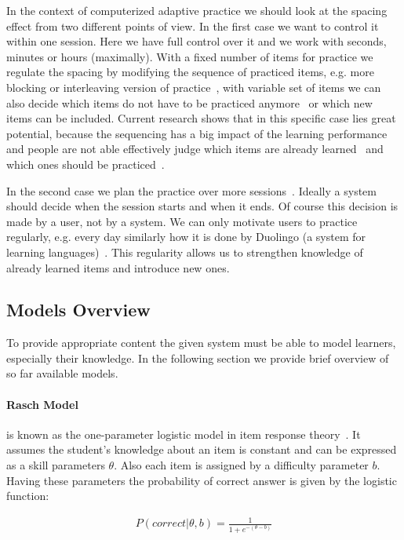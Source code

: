 \documentclass[table,color,cover,twoside,nolot,nolof]{fithesis3/fithesis3}
\begin{document}
In the context of computerized adaptive practice we should look at the spacing
effect from two different points of view. In the first case we want to control
it within one session. Here we have full control over it and we work with
seconds, minutes or hours (maximally). With a fixed number of items for
practice we regulate the spacing by modifying the sequence of practiced items,
e.g. more blocking or interleaving version of
practice~\cite{ostrow2015blocking}, with variable set of items we can also
decide which items do not have to be practiced
anymore~\cite{kornell2008optimising} or which new items can be included.
Current research shows that in this specific case lies great potential, because
the sequencing has a big impact of the learning
performance~\cite{ostrow2015blocking} and people are not able effectively judge
which items are already learned~\cite{kornell2008optimising} and which ones
should be practiced~\cite{kornell2014focusing}.

In the second case we plan the practice over more
sessions~\cite{kang2014retrieval}. Ideally a system should decide when the
session starts and when it ends. Of course this decision is made by a user,
not by a system. We can only motivate users to practice regularly, e.g. every
day similarly how it is done by Duolingo (a system for learning
languages)~\cite{garcia2013learning}. This regularity allows us to strengthen
knowledge of already learned items and introduce new ones.

\subsection{Models Overview}

To provide appropriate content the given system must be able to model learners,
especially their knowledge. In the following section we provide brief overview
of so far available models.

\paragraph*{Rasch Model} is known as the one-parameter logistic model in item
response theory~\cite{de2008theory}. It assumes the student's knowledge about
an item is constant and can be expressed as a skill parameters $\theta$. Also
each item is assigned by a difficulty parameter $b$. Having these parameters
the probability of correct answer is given by the logistic function:

\begin{align}
P(correct|\theta,b) = \frac{1}{1 + e^{-(\theta - b)}}
\end{align}
\end{document}
